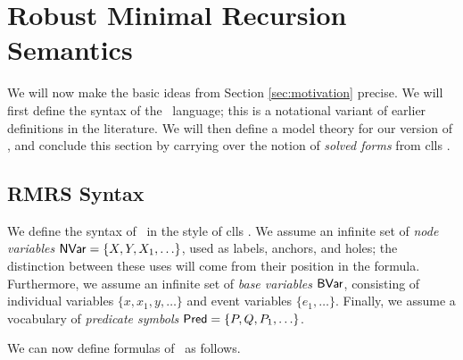 \section{Robust Minimal Recursion Semantics}
\label{sec:rmrs}

We will now make the basic ideas from Section \ref{sec:motivation}
precise.  We will first define the syntax of the \rmrs\ language; this
is a notational variant of earlier definitions in the literature.  We
will then define a model theory for our version of \rmrs, and conclude
this section by carrying over the notion of \emph{solved forms} from
{\sc clls} \cite{egg:etal:2001}.



\subsection{RMRS Syntax}

We define the syntax of \rmrs\ in the style of {\sc clls}
\cite{egg:etal:2001}.  We assume an infinite set of {\em node
  variables} $\mathsf{NVar}=\{X,Y,X_1,\ldots\}$, used as labels, anchors, and
holes; the distinction between these uses will come from their
position in the formula.  Furthermore, we assume an infinite set of
\emph{base variables} $\mathsf{BVar}$, consisting of individual variables
$\{x,x_1,y,\ldots\}$ and event variables $\{e_1,\ldots\}$.  Finally,
we assume a vocabulary of \emph{predicate symbols}
$\mathsf{Pred}=\{P,Q,P_1,\ldots\}$.

We can now define formulas of \rmrs\ as follows.

